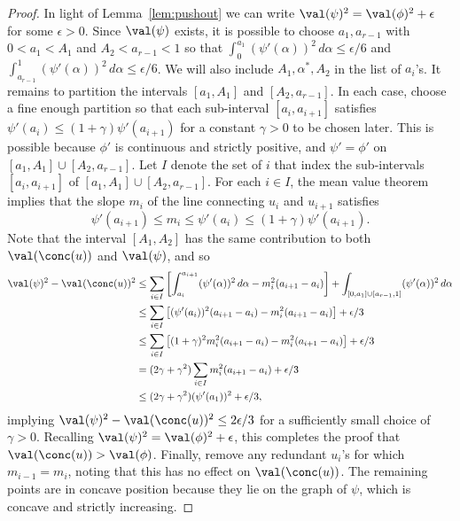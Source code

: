 \documentclass[11pt]{article}
\begin{document}
\begin{proof}
In light of Lemma~\ref{lem:pushout} we can write $\val(\psi)^2 = \val(\phi)^2 + \epsilon$ for some $\epsilon > 0$. Since $\val(\psi)$ exists, it is possible to choose $a_1,a_{r-1}$ with $0 < a_1 < A_1$ and $A_2 < a_{r-1} < 1$ so that $\int_0^{a_1} (\psi'(\alpha))^2\,d\alpha \le \epsilon/6$ and $\int_{a_{r-1}}^1 (\psi'(\alpha))^2\,d\alpha \le \epsilon/6$. We will also include $A_1,\alpha^*,A_2$ in the list of $a_i$'s. It remains to partition the intervals $[a_1,A_1]$ and $[A_2,a_{r-1}]$. In each case, choose a fine enough partition so that each sub-interval $[a_i,a_{i+1}]$ satisfies $\psi'(a_i) \le (1+\gamma) \psi'(a_{i+1})$ for a constant $\gamma > 0$ to be chosen later. This is possible because $\phi'$ is continuous and strictly positive, and $\psi' = \phi'$ on $[a_1,A_1] \cup [A_2,a_{r-1}]$. Let $I$ denote the set of $i$ that index the sub-intervals $[a_i,a_{i+1}]$ of $[a_1,A_1] \cup [A_2,a_{r-1}]$. For each $i \in I$, the mean value theorem implies that the slope $m_i$ of the line connecting $u_i$ and $u_{i+1}$ satisfies
\[ \psi'(a_{i+1}) \le m_i \le \psi'(a_i) \le (1+\gamma)\psi'(a_{i+1}). \]
Note that the interval $[A_1,A_2]$ has the same contribution to both $\val(\conc(u))$ and $\val(\psi)$, and so
\begin{align*}
\val(\psi)^2 - \val(\conc(u))^2 &\le \sum_{i \in I} \left[\int_{a_i}^{a_{i+1}} (\psi'(\alpha))^2\,d\alpha - m_i^2(a_{i+1}-a_i)\right] + \int_{[0,a_1] \cup [a_{r-1},1]} (\psi'(\alpha))^2\,d\alpha \\
&\le \sum_{i \in I} \left[(\psi'(a_i))^2 (a_{i+1}-a_i) - m_i^2(a_{i+1}-a_i)\right] + \epsilon/3 \\
&\le \sum_{i \in I} \left[(1+\gamma)^2 m_i^2 (a_{i+1}-a_i) - m_i^2(a_{i+1}-a_i)\right] + \epsilon/3 \\
&= (2\gamma + \gamma^2) \sum_{i \in I} m_i^2(a_{i+1}-a_i) + \epsilon/3 \\
&\le (2\gamma + \gamma^2) (\psi'(a_1))^2 + \epsilon/3,
\end{align*}
implying $\val(\psi)^2 - \val(\conc(u))^2 \le 2\epsilon/3$ for a sufficiently small choice of $\gamma > 0$. Recalling $\val(\psi)^2 = \val(\phi)^2 + \epsilon$, this completes the proof that $\val(\conc(u)) > \val(\phi)$. Finally, remove any redundant $u_i$'s for which $m_{i-1} = m_i$, noting that this has no effect on $\val(\conc(u))$. The remaining points are in concave position because they lie on the graph of $\psi$, which is concave and strictly increasing.
\end{proof}
\end{document}

